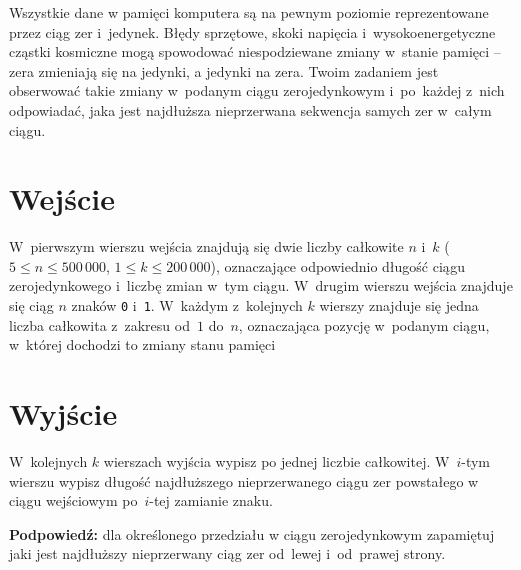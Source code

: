 \documentclass{spiral-kurs}
\begin{document}
\makeheader
%
	Wszystkie dane w pamięci komputera są na pewnym poziomie reprezentowane
	przez ciąg zer i~jedynek. Błędy sprzętowe, skoki napięcia
	i~wysokoenergetyczne cząstki kosmiczne mogą spowodować niespodziewane
	zmiany w~stanie pamięci -- zera zmieniają się na jedynki, a jedynki
	na zera. Twoim zadaniem jest obserwować takie zmiany w~podanym ciągu
	zerojedynkowym i~po~każdej z~nich odpowiadać, jaka jest najdłuższa
	nieprzerwana sekwencja samych zer w~całym ciągu.

	\section{Wejście}
	W~pierwszym wierszu wejścia znajdują się dwie liczby całkowite $n$
	i~$k$ ($5 \leq n \leq 500\,000$, $1 \leq k \leq 200\,000$), oznaczające
	odpowiednio długość ciągu zerojedynkowego i~liczbę zmian w~tym ciągu.
	W~drugim wierszu wejścia znajduje się ciąg $n$ znaków \texttt{0}
	i~\texttt{1}. W~każdym z~kolejnych $k$ wierszy znajduje się jedna liczba
	całkowita z~zakresu od~$1$ do~$n$, oznaczająca pozycję w~podanym ciągu,
	w~której dochodzi to zmiany stanu pamięci 

	\section{Wyjście}
	W~kolejnych $k$ wierszach wyjścia wypisz po jednej liczbie całkowitej.
	W~$i$-tym wierszu wypisz długość najdłuższego nieprzerwanego ciągu zer
	powstałego w ciągu wejściowym po~$i$-tej zamianie znaku.

	\vspace{-4pt}

	\noindent
	\textbf{Podpowiedź:} dla określonego przedziału w ciągu zerojedynkowym
	zapamiętuj jaki jest najdłuższy nieprzerwany ciąg zer od~lewej
	i~od~prawej strony.
\end{document}
